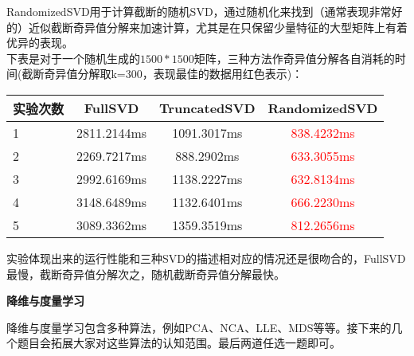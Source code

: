 \documentclass[answers]{exam}  %
\begin{document}
\begin{questions}
\begin{solution}
\begin{parts}
		RandomizedSVD用于计算截断的随机SVD，通过随机化来找到（通常表现非常好的）近似截断奇异值分解来加速计算，尤其是在只保留少量特征的大型矩阵上有着优异的表现。\\
		下表是对于一个随机生成的$1500*1500$矩阵，三种方法作奇异值分解各自消耗的时间(截断奇异值分解取k=300，表现最佳的数据用红色表示)：\\

			\begin{center}
			  \begin{tabular}{lccc}
				\hline
				\textbf{实验次数} & \textbf{FullSVD} & \textbf{TruncatedSVD} & \textbf{RandomizedSVD}\\
				\hline
				1 & 2811.2144ms & 1091.3017ms & \textcolor{red}{838.4232ms} \\
				\hline
				2 & 2269.7217ms & 888.2902ms & \textcolor{red}{633.3055ms}\\
				\hline
				3 & 2992.6169ms & 1138.2227ms & \textcolor{red}{632.8134ms}\\
				\hline
				4 & 3148.6489ms & 1132.6401ms & \textcolor{red}{666.2230ms}\\
				\hline
				5 & 3089.3362ms & 1359.3519ms & \textcolor{red}{812.2656ms}\\
				\hline
			  \end{tabular}
			\end{center}
		实验体现出来的运行性能和三种SVD的描述相对应的情况还是很吻合的，FullSVD最慢，截断奇异值分解次之，随机截断奇异值分解最快。
	\end{parts}
\end{solution}

\question [15] \textbf{降维与度量学习}

降维与度量学习包含多种算法，例如PCA、NCA、LLE、MDS等等。接下来的几个题目会拓展大家对这些算法的认知范围。最后两道任选一题即可。
\end{questions}
\end{document}
